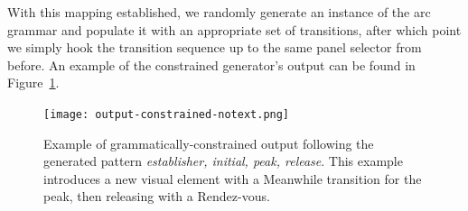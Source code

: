 %
%
\newcommand{\caveat}{
This mapping is guided by our intuition rather than 
systematic symbolic reasoning. We aim to rule out obvious-seeming
syntactic errors, e.g. a \emph{meanwhile} transition at the end of an arc, but
other constraints are not so easily expressed. For instance, perhaps a
\emph{prolongation} should be realized as a repetition of the previous
transition, but this information is not available in the bigram model. In
future work, we would like to refine the theoretical grounding of the
relationship between transitions and grammatical categories.}
%
With this mapping established, %
we randomly generate an instance of the arc grammar and populate it with an
appropriate set of transitions, after which point we simply hook the
transition sequence up to the same panel selector from before. An example
of the constrained generator's output can be found in
Figure~\ref{fig:outgood}. %

\begin{figure}[tb]
\centering
\texttt{[image: output-constrained-notext.png]}
\caption{Example of grammatically-constrained output following the
generated pattern {\em establisher, initial, peak, release}.
This example introduces a new visual element with a Meanwhile transition for the peak,
then releasing with a Rendez-vous.
}
\label{fig:outgood}
\end{figure}

%



